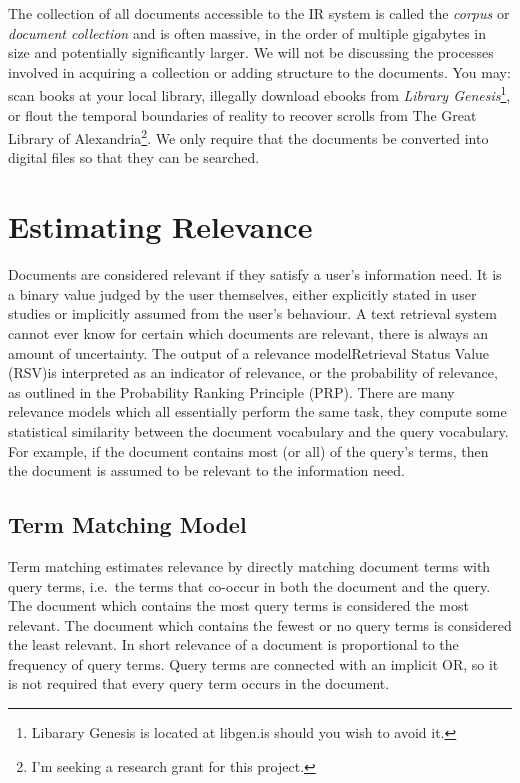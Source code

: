 The collection of all documents accessible to the IR system is called the \textit{corpus} or \textit{document collection} and is often massive, in the order of multiple gigabytes in size and potentially significantly larger. We will not be discussing the processes involved in acquiring a collection or adding structure to the documents. You may: scan books at your local library, illegally download ebooks from \textit{Library Genesis}\footnote{Libarary Genesis is located at libgen.is should you wish to avoid it.}, or flout the temporal boundaries of reality to recover scrolls from The Great Library of Alexandria\footnote{I'm seeking a research grant for this project.}. We only require that the documents be converted into digital files so that they can be searched.

\section{Estimating Relevance}
Documents are considered relevant if they satisfy a user's information need. It is a binary value judged by the user themselves, either explicitly stated in user studies or implicitly assumed from the user's behaviour. A text retrieval system cannot ever know for certain which documents are relevant, there is always an amount of uncertainty. The output of a relevance model\textemdash Retrieval Status Value (RSV)\textemdash is interpreted as an indicator of relevance, or the probability of relevance, as outlined in the Probability Ranking Principle \cite{jones2000probabilistic} (PRP). There are many relevance models which all essentially perform the same task, they compute some statistical similarity between the document vocabulary and the query vocabulary. For example, if the document contains most (or all) of the query's terms, then the document is assumed to be relevant to the information need. 




\subsection{Term Matching Model}
Term matching estimates relevance by directly matching document terms with query terms, i.e.\ the terms that co-occur in both the document and the query. The document which contains the most query terms is considered the most relevant. The document which contains the fewest or no query terms is considered the least relevant. In short relevance of a document is proportional to the frequency of query terms. Query terms are connected with an implicit OR, so it is not required that every query term occurs in the document. 

